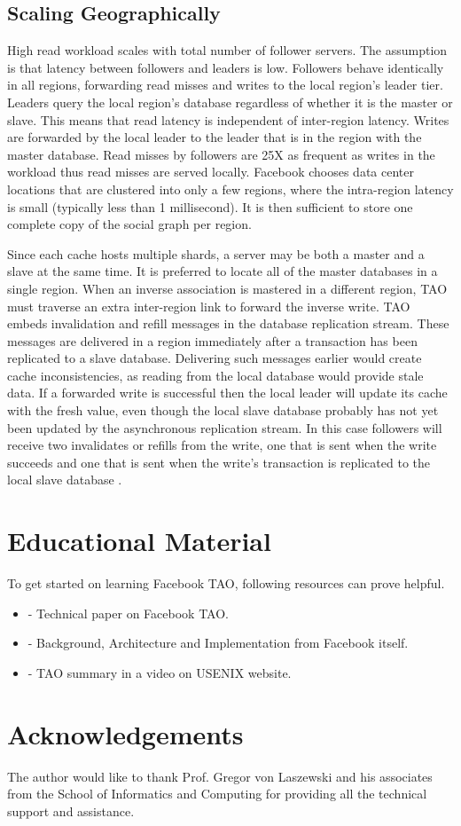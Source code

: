 \documentclass[9pt,twocolumn,twoside]{../../styles/osajnl}
\begin{document}
\subsection {Scaling Geographically}
High read workload scales with total number of follower servers. The assumption is that latency between followers and leaders is low. Followers behave identically in all regions, forwarding read misses and writes to the local region’s leader tier. Leaders query the local region’s database regardless of whether it is the master or slave. This means that read latency is independent of inter-region latency. Writes are forwarded by the local leader to the leader that is in the region with the master database. Read misses by followers are 25X as frequent as writes in the workload thus read misses are served locally. Facebook chooses data center locations that are clustered into only a few regions, where the intra-region latency is small (typically less than 1 millisecond). It is then sufficient to store one complete copy of the social graph per region.

Since each cache hosts multiple shards, a server may be both a master and a slave at the same time. It is preferred to locate all of the master databases in a single region. When an inverse association is mastered in a different region, TAO must traverse an extra inter-region link to forward the inverse write. TAO embeds invalidation and refill messages in the database replication stream. These messages are delivered in a region immediately after a transaction has been replicated to a slave database. Delivering such messages earlier would create cache inconsistencies, as reading from the local database would provide stale data. If a forwarded write is successful then the local leader will update its cache with the fresh value, even though the local slave database probably has not yet been updated by the asynchronous replication stream. In this case followers will receive two invalidates or refills from the write, one that is sent when the write succeeds and one that is sent when the write’s transaction is replicated to the local slave database \cite{www-tao4}.

\section{Educational Material}

To get started on learning Facebook TAO, following resources can prove helpful.

\begin{itemize}
\item \cite{book-tao1} - Technical paper on Facebook TAO.

\item \cite{www-tao2} - Background, Architecture and Implementation from Facebook itself.

\item \cite{www-tao3} - TAO summary in a video on USENIX website.

\end{itemize}

\section {Acknowledgements}
The author would like to thank Prof. Gregor von Laszewski and his associates from the School of Informatics and Computing for providing all the technical support and assistance.



\end{document}
